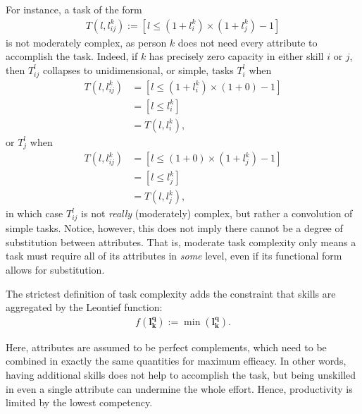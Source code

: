 \documentclass[hidelinks, nonatbib]{elsarticle}
\begin{document}
\begin{definition}
\begin{subdefinition}
        For instance, a task of the form
    \begin{gather}
        T(l, l_{ij}^{k})
        := [l \leq (1 + l_{i}^{k}) \times (1 + l_{j}^{k}) - 1]
    \end{gather}
    is not moderately complex, as person $k$ does not need every attribute to accomplish the task. Indeed, if $k$ has precisely zero capacity in either skill $i$ or $j$, then $T_{ij}^{l}$ collapses to unidimensional, or simple, tasks $T_{i}^{l}$ when
    \begin{align}
        T(l, l_{ij}^{k})
        &= [l \leq (1 + l_{i}^{k}) \times (1 + 0) - 1]
        \\
        &= [l \leq l_{i}^{k}]
        \\
        &= T(l, l_{i}^{k})
        ,
    \end{align}
    or $T_{j}^{l}$ when
    \begin{align}
        T(l, l_{ij}^{k})
        &= [l \leq (1 + 0) \times (1 + l_{j}^{k}) - 1]
        \\
        &= [l \leq l_{j}^{k}]
        \\
        &= T(l, l_{j}^{k})
        ,
    \end{align}
    in which case $T_{ij}^{l}$ is not \textit{really} (moderately) complex, but rather a convolution of simple tasks. Notice, however, this does not imply there cannot be a degree of substitution between attributes. That is, moderate task complexity only means a task must require all of its attributes in \textit{some} level, even if its functional form allows for substitution.
    
    \end{subdefinition}
    
    \begin{subdefinition}
        The strictest definition of task complexity adds the constraint that skills are aggregated by the Leontief function:
        \begin{gather}
            f(\boldsymbol{l_{k}^{q}})
            := 
            \min(\boldsymbol{l_{k}^{q}})
            .
        \end{gather}

        Here, attributes are assumed to be perfect complements, which need to be combined in exactly the same quantities for maximum efficacy. In other words, having additional skills does not help to accomplish the task, but being unskilled in even a single attribute can undermine the whole effort. Hence, productivity is limited by the lowest competency.
    \end{subdefinition}

\end{definition}
\end{document}
